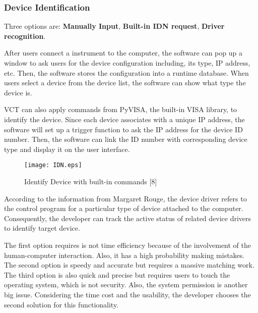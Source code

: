 \documentclass [10pt]{article}
\begin{document}
\subsubsection{Device Identification}
Three options are: \textbf{Manually Input}, \textbf{Built-in IDN request}, \textbf{Driver recognition}. \par
After users connect a instrument to the computer, the software can pop up a window to ask users for the device configuration including, its type, IP address, etc.  Then, the software stores the configuration into a runtime database. When users select a device from the device list, the software can show what type the device is.  \par
VCT can also apply commands from PyVISA, the built-in VISA library, to identify the device. Since each device associates with a unique IP address, the software will set up a trigger function to ask the IP address for the device ID number. Then, the software can link the ID number with corresponding device type and display it on the user interface. \par  
\begin{figure}[h]
\centering
\texttt{[image: IDN.eps]}
\caption{Identify Device with built-in commands [8]}
\end{figure}
According to the information from Margaret Rouge, the device driver refers to the control program for a particular type of device attached to the computer. Consequently, the developer can track the active status of related device drivers to identify target device.\par
The first option requires is not time efficiency because of the involvement of the human-computer interaction. Also, it has a high probability making mistakes. The second option is speedy and accurate but requires a massive matching work. The third option is also quick and precise but requires users to touch the operating system, which is not security. Also, the system permission is another big issue. Considering the time cost and the usability, the developer chooses the second solution for this functionality.
\end{document}
